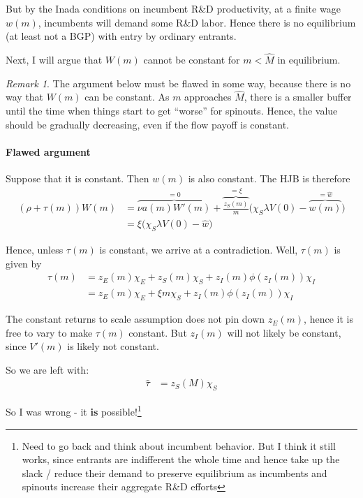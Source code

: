 \documentclass[12pt,english]{article}
\theoremstyle{remark}
\newtheorem*{remark}{Remark}
\begin{document}
But by the Inada conditions on incumbent R\&D productivity, at a finite wage $w(m)$, incumbents will demand some R\&D labor. Hence there is no equilibrium (at least not a BGP) with entry by ordinary entrants. 

Next, I will argue that $W(m)$ cannot be constant for $m < \hat{M}$ in equilibrium. 

\begin{remark}
	The argument below must be flawed in some way, because there is no way that $W(m)$ can be constant. As $m$ approaches $\hat{M}$, there is a smaller buffer until the time when things start to get ``worse'' for spinouts. Hence, the value should be gradually decreasing, even if the flow payoff is constant.
\end{remark}

\paragraph{Flawed argument}
Suppose that it is constant. Then $w(m)$ is also constant. The HJB is therefore
\begin{align*}
	(\rho + \tau(m)) W(m) &= \overbrace{\nu a(m) W'(m)}^{= 0}+ \overbrace{\frac{z_S(m)}{m}}^{= \xi} \Big( \chi_S  \lambda V(0) - \overbrace{w(m)}^{=\hat{w}} \Big) \\
	                      &= \xi \Big( \chi_S \lambda V(0) - \hat{w} \Big)
\end{align*}

Hence, unless $\tau(m)$ is constant, we arrive at a contradiction. Well, $\tau(m)$ is given by 
\begin{align*}
	\tau(m) &= z_E(m)\chi_E + z_S(m) \chi_S + z_I(m) \phi(z_I(m)) \chi_I  \\
	        &= z_E(m) \chi_E + \xi m \chi_S + z_I(m) \phi(z_I(m)) \chi_I 
\end{align*}

The constant returns to scale assumption does not pin down $z_E(m)$, hence it is free to vary to make $\tau(m)$ constant. But $z_I(m)$ will not likely be constant, since $V'(m)$ is likely not constant. 


So we are left with:
\begin{align*}
	\hat{\tau} &= z_S(M) \chi_S 
\end{align*}

So I was wrong - it \textbf{is} possible!\footnote{Need to go back and think about incumbent behavior. But I think it still works, since entrants are indifferent the whole time and hence take up the slack / reduce their demand to preserve equilibrium as incumbents and spinouts increase their aggregate R\&D efforts}
\end{document}

